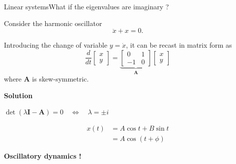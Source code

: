 \documentclass[usenames,dvipsnames,svgnames,10pt,aspectratio=169]{beamer}
\begin{document}
\begin{frame}[t, c]{Linear systems}{What if the eigenvalues are imaginary ?}
  \begin{minipage}{.48\textwidth}
    Consider the harmonic oscillator
    \[
    \ddot{x} + x = 0.
    \]

    Introducing the change of variable $y = \dot{x}$, it can be recast in matrix form as
    \[
    \dfrac{d}{dt} \begin{bmatrix} x \\ y \end{bmatrix}
    =
    \underbrace{
      \begin{bmatrix}
        0 & 1 \\
        -1 & 0
      \end{bmatrix}
    }_{\bm{A}}
    \begin{bmatrix} x \\ y \end{bmatrix}
    \]
    where $\bm{A}$ is skew-symmetric.
  \end{minipage}%
  \hfill
  \begin{minipage}{.48\textwidth}
    \centering
    \textbf{Solution}
    
    \medskip
    
    \( \det(\lambda \bm{I} - \bm{A}) = 0 \quad \Leftrightarrow \quad \lambda = \pm i \)
    
    \bigskip
    
    \[
    \begin{aligned}
      x(t) & = A \cos t + B \sin t \\
      & = A \cos(t + \phi)
    \end{aligned}
    \]
    
    \bigskip
    
    \begin{block}{}
      \centering
      \textbf{Oscillatory dynamics !}
    \end{block}
  \end{minipage}

  \vspace{1cm}
\end{frame}
\end{document}
